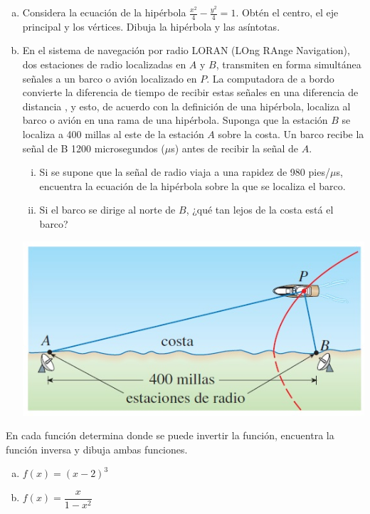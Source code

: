 \documentclass[10pt]{exam}
\begin{document}
\begin{questions}
    \question 
    \begin{enumerate}[a)]
        \item Considera la ecuación de la hipérbola $\frac{x^2}{4}-\frac{y^2}{4}=1$. Obtén el centro, el eje principal y los vértices. Dibuja la hipérbola y las asíntotas.
        \item En el sistema de navegación por radio LORAN (LOng RAnge Navigation), dos estaciones de radio localizadas en $A$ y $B$, transmiten en forma simultánea señales a un barco o avión localizado en $P$. La computadora de a bordo convierte la diferencia de tiempo de recibir estas señales en una diferencia de distancia , y esto, de acuerdo con la definición de una hipérbola, localiza al barco o avión en una rama de una hipérbola. Suponga que la estación $B$ se localiza a 400 millas al este de la estación $A$ sobre la costa. Un barco recibe la señal de B 1200 microsegundos ($\mu$s) antes de recibir la señal de $A$.
        \begin{enumerate}[i)]
        \item Si se supone que la señal de radio viaja a una rapidez de 980 pies/$\mu$s, encuentra la ecuación de la hipérbola sobre la que se localiza el barco.
        \item Si el barco se dirige al norte de $B$, ¿qué tan lejos de la costa está el barco?
         \end{enumerate}{}

        \centering
      \vskip15pt
 \includegraphics[scale=1]{Hiperbola.jpg}

    \end{enumerate}{}

   \question
   En cada función determina donde se puede invertir la función, encuentra la función inversa y dibuja ambas funciones. 
   \begin{enumerate}[a)]
   \item $f(x)=(x-2)^3$
   \item $f(x)=\dfrac{x}{1-x^2}$
   \end{enumerate}

    
    \end{questions}
\end{document}
